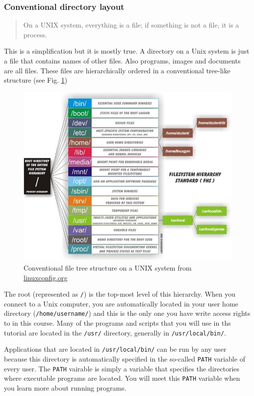 \documentclass[11pt]{article}
\begin{document}
\subsubsection{Conventional directory layout}
\label{sec-2-1-1}


\begin{quote}
On a UNIX system, everything is a file; if something is not a file, it is a process.
\end{quote}

This is a simplification but it is mostly true. A directory on a Unix
system is just a file that contains names of other files. Also
programs, images and documents are all files. These files are
hierarchically ordered in a conventional tree-like structure (see
Fig. \ref{fig:linuxfiletree})


\begin{figure}[htb]
\centering
\includegraphics[width=12cm]{linuxfiletree.jpg}
\caption{\label{fig:linuxfiletree}Conventional file tree structure on a UNIX system from \href{http://linuxconfig.org/filesystem-basics}{linuxconfig.org}}
\end{figure}


The root (represented as \texttt{/}) is the top-most level of this hierarchy.
When you connect to a Unix computer, you are automatically located in
your user home directory (\texttt{/home/username/}) and this is the only one
you have write access rights to in this course. Many of the programs and
scripts that you will use in ths tutorial are located in the \texttt{/usr/}
directory, generally in \texttt{/usr/local/bin/}. 

Applications that are located in \texttt{/usr/local/bin/} can be run by any
user because this directory is automatically specified in the so-called
\texttt{PATH} variable of every user. The \texttt{PATH} vairable is simply a
variable that specifies the directories where executable programs are
located. You will meet this \texttt{PATH} variable when you learn more about
running programs.
\end{document}
